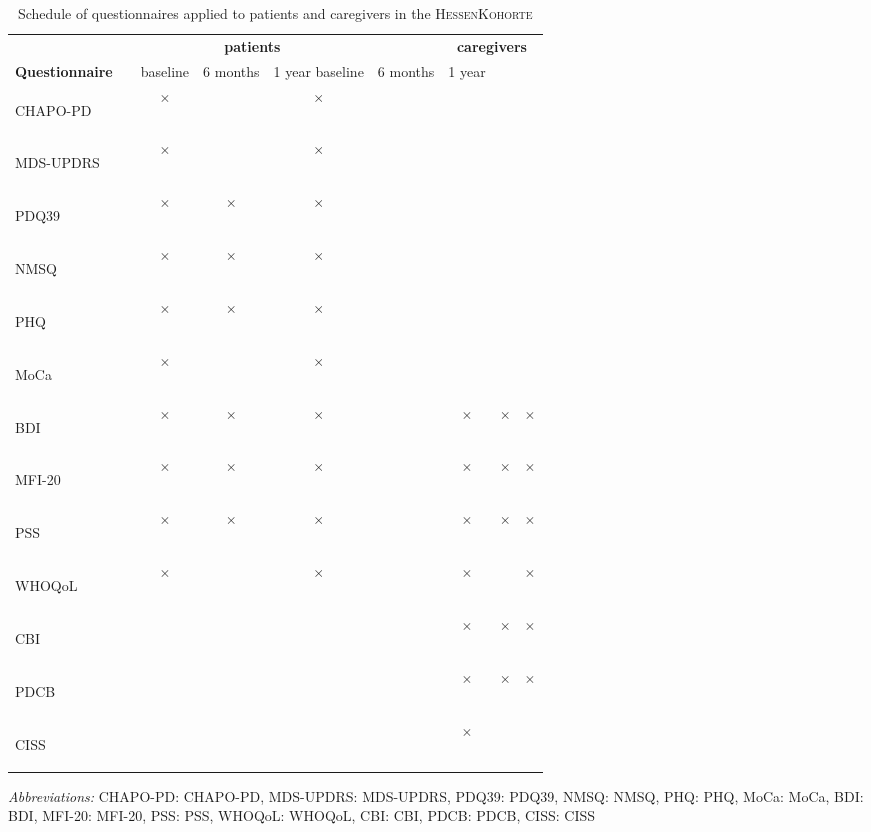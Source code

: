 \newcommand{\FC}{$\times$}
\newcommand{\emC}{}
\newcommand{\acb}[1]{\acs{#1}: \acl{#1}}
\newcommand{\acv}[1]{\begin{NoHyper}\acs{#1}\end{NoHyper}}
\begin{table}[]
\begin{tabular}{lcccccccc}
\caption{Schedule of questionnaires applied to patients and caregivers in the \textsc{HessenKohorte}}
\label{tab:questionnaireSchedule}\\
\textbf{} & & \multicolumn{3}{c}{\textbf{patients}} & & \multicolumn{3}{c}{\textbf{caregivers}} \\[1em]
\textbf{Questionnaire}& & baseline & 6 months & 1 year  baseline   & 6 months & 1 year \\[1em]
\acv{CHAPO-PD}        & & \FC{}    & \emC{}   & \FC{}   & & \emC{} & \emC{}   & \emC{} \\
\acv{MDS-UPDRS}       & & \FC{}    & \emC{}   & \FC{}   & & \emC{} & \emC{}   & \emC{} \\
\acv{PDQ39}           & & \FC{}    & \FC{}    & \FC{}   & & \emC{} & \emC{}   & \emC{} \\
\acv{NMSQ}            & & \FC{}    & \FC{}    & \FC{}   & & \emC{} & \emC{}   & \emC{} \\
\acv{PHQ}             & & \FC{}    & \FC{}    & \FC{}   & & \emC{} & \emC{}   & \emC{} \\
\acv{MoCa}            & & \FC{}    & \emC{}   & \FC{}   & & \emC{} & \emC{}   & \emC{} \\
\acv{BDI}             & & \FC{}    & \FC{}    & \FC{}   & & \FC{}  & \FC{}    & \FC{}  \\
\acv{MFI-20}          & & \FC{}    & \FC{}    & \FC{}   & & \FC{}  & \FC{}    & \FC{}  \\
\acv{PSS}             & & \FC{}    & \FC{}    & \FC{}   & & \FC{}  & \FC{}    & \FC{}  \\ 
\acv{WHOQoL}          & & \FC{}    & \emC{}   & \FC{}   & & \FC{}  & \emC{}   & \FC{}  \\
\acv{CBI}             & & \emC{}   & \emC{}   & \emC{}  & & \FC{}  & \FC{}    & \FC{}  \\
\acv{PDCB}            & & \emC{}   & \emC{}   & \emC{}  & & \FC{}  & \FC{}    & \FC{}  \\                              
\acv{CISS}            & & \emC{}   & \emC{}   & \emC{}  & & \FC{}  & \emC{}   & \emC{}
\end{tabular}

\bigskip
\footnotesize{\textit{Abbreviations:} \acb{CHAPO-PD}, \acb{MDS-UPDRS}, \acb{PDQ39}, \acb{NMSQ}, \acb{PHQ},
\acb{MoCa}, \acb{BDI}, \acb{MFI-20}, \acb{PSS}, \acb{WHOQoL}, \acb{CBI}, \acb{PDCB}, \acb{CISS}}
\end{table}
